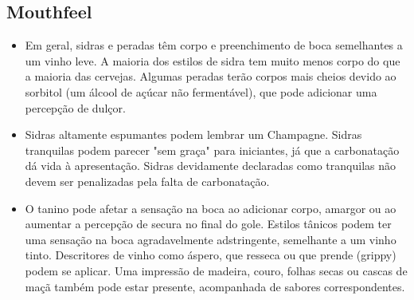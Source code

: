 \subsection*{Mouthfeel}
\begin{itemize}
\item Em geral, sidras e peradas têm corpo e preenchimento de boca semelhantes a um vinho leve. A maioria dos estilos de sidra tem muito menos corpo do que a maioria das cervejas. Algumas peradas terão corpos mais cheios devido ao sorbitol (um álcool de açúcar não fermentável), que pode adicionar uma percepção de dulçor.
\item Sidras altamente espumantes podem lembrar um Champagne. Sidras tranquilas podem parecer "sem graça" para iniciantes, já que a carbonatação dá vida à apresentação. Sidras devidamente declaradas como tranquilas não devem ser penalizadas pela falta de carbonatação.
\item O tanino pode afetar a sensação na boca ao adicionar corpo, amargor ou ao aumentar a percepção de secura no final do gole. Estilos tânicos podem ter uma sensação na boca agradavelmente adstringente, semelhante a um vinho tinto. Descritores de vinho como áspero, que resseca ou que prende (grippy) podem se aplicar. Uma impressão de madeira, couro, folhas secas ou cascas de maçã também pode estar presente, acompanhada de sabores correspondentes.
\end{itemize}
